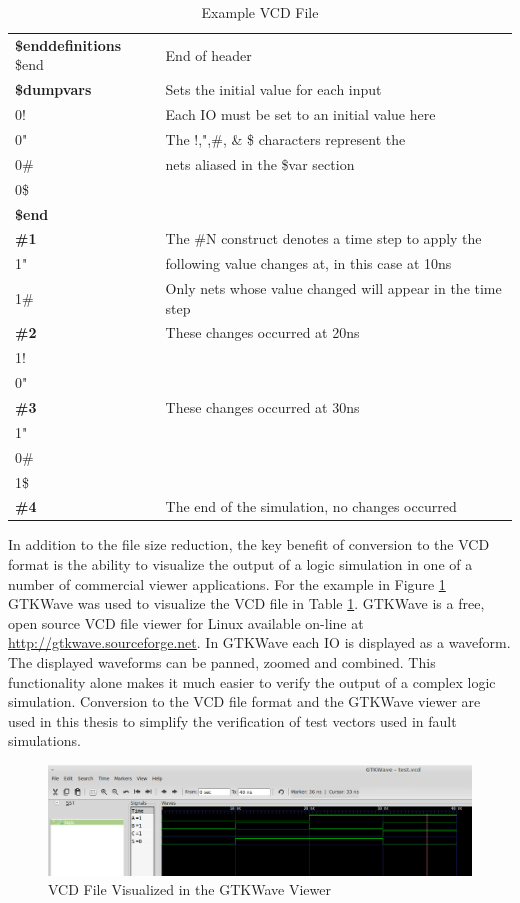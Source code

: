 \documentclass[12pt]{report}
\begin{document}
\begin{table}
\begin{center}
\begin{tabular}{l|l}
			\textbf{\$enddefinitions} \$end & End of header \\
			\textbf{\$dumpvars} & Sets the initial value for each input \\
			0!	& Each IO must be set to an initial value here \\
			0"	& The !,",\#, \& \$ characters represent the\\
			0\# & nets aliased in the \$var section\\
			0\$ & \\
			\textbf{\$end} & \\
			\textbf{\#1} & The \#N construct denotes a time step to apply the \\
			1" & following value changes at, in this case at 10ns \\
			1\# & Only nets whose value changed will appear in the time step\\
			\textbf{\#2} & These changes occurred at 20ns \\ 
			1! & \\
			0" & \\
			\textbf{\#3} & These changes occurred at 30ns\\
			1" & \\
			0\# & \\
			1\$ & \\	
			\textbf{\#4} & The end of the simulation, no changes occurred \\		
		\end{tabular}
	\end{center}
	\caption{Example VCD File}
	\label{tbl:half_adder_vcd}
\end{table} 
In addition to the file size reduction, the key benefit of conversion to the VCD format is the ability to visualize the output of a logic simulation in one of a number of commercial viewer applications.  For the example in Figure \ref{fig:half-adder-gtkwave} GTKWave was used to visualize the VCD file in Table \ref{tbl:half_adder_vcd}.  GTKWave is a free, open source VCD file viewer for Linux available on-line at \url{http://gtkwave.sourceforge.net}.  In GTKWave each IO is displayed as a waveform.  The displayed waveforms can be panned, zoomed and combined.  This functionality alone makes it much easier to verify the output of a complex logic simulation.  Conversion to the VCD file format and the GTKWave viewer are used in this thesis to simplify the verification of test vectors used in fault simulations.
\begin{figure}
	\begin{center}
		\includegraphics[scale=.4]{images/half-adder-vcd}
	\end{center}
	\caption{VCD File Visualized in the GTKWave Viewer}
	\label{fig:half-adder-gtkwave}
\end{figure}
\end{document}
